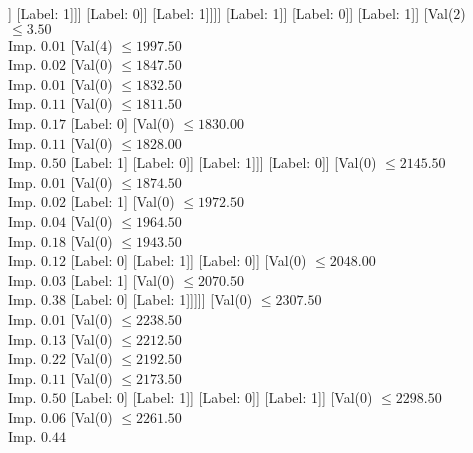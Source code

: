 \documentclass[margin=10pt]{standalone}
\begin{document}
\begin{forest}
																[Val($0$) $ \leq 1694.50$ \\ Imp. $0.50$
																	[Label: 1]
																	[Label: 0]]
																[Label: 1]]]
														[Label: 0]]
													[Label: 1]]]]
										[Label: 1]]
									[Label: 0]]
								[Label: 1]]
							[Val($2$) $ \leq 3.50$ \\ Imp. $0.01$
								[Val($4$) $ \leq 1997.50$ \\ Imp. $0.02$
									[Val($0$) $ \leq 1847.50$ \\ Imp. $0.01$
										[Val($0$) $ \leq 1832.50$ \\ Imp. $0.11$
											[Val($0$) $ \leq 1811.50$ \\ Imp. $0.17$
												[Label: 0]
												[Val($0$) $ \leq 1830.00$ \\ Imp. $0.11$
													[Val($0$) $ \leq 1828.00$ \\ Imp. $0.50$
														[Label: 1]
														[Label: 0]]
													[Label: 1]]]
											[Label: 0]]
										[Val($0$) $ \leq 2145.50$ \\ Imp. $0.01$
											[Val($0$) $ \leq 1874.50$ \\ Imp. $0.02$
												[Label: 1]
												[Val($0$) $ \leq 1972.50$ \\ Imp. $0.04$
													[Val($0$) $ \leq 1964.50$ \\ Imp. $0.18$
														[Val($0$) $ \leq 1943.50$ \\ Imp. $0.12$
															[Label: 0]
															[Label: 1]]
														[Label: 0]]
													[Val($0$) $ \leq 2048.00$ \\ Imp. $0.03$
														[Label: 1]
														[Val($0$) $ \leq 2070.50$ \\ Imp. $0.38$
															[Label: 0]
															[Label: 1]]]]]
											[Val($0$) $ \leq 2307.50$ \\ Imp. $0.01$
												[Val($0$) $ \leq 2238.50$ \\ Imp. $0.13$
													[Val($0$) $ \leq 2212.50$ \\ Imp. $0.22$
														[Val($0$) $ \leq 2192.50$ \\ Imp. $0.11$
															[Val($0$) $ \leq 2173.50$ \\ Imp. $0.50$
																[Label: 0]
																[Label: 1]]
															[Label: 0]]
														[Label: 1]]
													[Val($0$) $ \leq 2298.50$ \\ Imp. $0.06$
														[Val($0$) $ \leq 2261.50$ \\ Imp. $0.44$

\end{forest}
\end{document}
